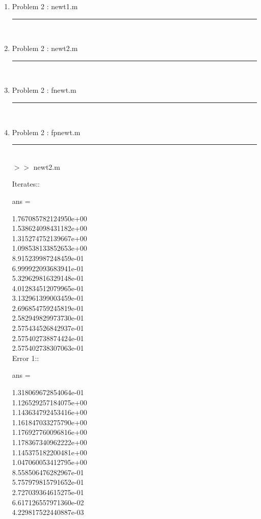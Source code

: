 \documentclass[12pt]{article}
\begin{document}
\pagebreak	
	
	\begin{enumerate}
	\item[] Problem 2 : newt1.m \noindent\rule{\textwidth}{1.0pt} \\
		
	
	\item[] Problem 2 : newt2.m \noindent\rule{\textwidth}{1.0pt} \\
		
	
		\item[] Problem 2 : fnewt.m \noindent\rule{\textwidth}{1.0pt} \\
	
	
		\item[] Problem 2 : fpnewt.m \noindent\rule{\textwidth}{1.0pt} \\
			

	$>>$ newt2.m 
	\begin{framed}
Iterates::

ans =

     1.767085782124950e+00\\
     1.538624098431182e+00\\
     1.315274752139667e+00\\
     1.098538133852653e+00\\
     8.915239987248459e-01\\
     6.999922093683941e-01\\
     5.329629816329148e-01\\
     4.012834512079965e-01\\
     3.132961399003459e-01\\
     2.696854759245819e-01\\
     2.582949829973730e-01\\
     2.575434526842937e-01\\
     2.575402738874424e-01\\
     2.575402738307063e-01\\

Error 1::

ans =

     1.318069672854064e-01\\
     1.126529257184075e+00\\
     1.143634792453416e+00\\
     1.161847033275790e+00\\
     1.176927760096816e+00\\
     1.178367340962222e+00\\
     1.145375182200481e+00\\
     1.047060053412795e+00\\
     8.558506476282967e-01\\
     5.757979815791652e-01\\
     2.727039364615275e-01\\
     6.617126557971360e-02\\
     4.229817522440887e-03\\


\end{framed}
\end{enumerate}
\end{document}

